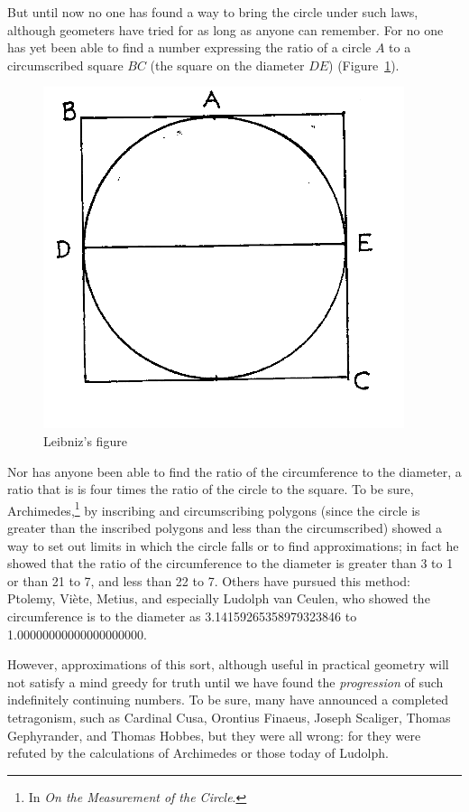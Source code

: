 \documentclass[polutonikogreek,english,twoside,openright]{article}
\begin{document}
But until now no one has found a way to bring the circle under such
laws, although geometers have tried for as long as anyone can
remember.  For no one has yet been able to find a number expressing
the ratio of a circle $A$ to a circumscribed square $BC$ (the square
on the diameter $DE$) (Figure~\ref{inscrcirc}).
\begin{figure}[htp]
  \begin{center}
    \includegraphics[width=.4\textwidth]{fig/Figure58}
    \caption{Leibniz's figure}
    \label{inscrcirc}
  \end{center}
\end{figure} Nor has anyone been able to find the ratio of the
circumference to the diameter, a ratio that is is four times the ratio
of the circle to the square.  To be sure, Archimedes,\footnote{In {\em
    On the Measurement of the Circle}.} by inscribing and
circumscribing polygons (since the circle is greater than the
inscribed polygons and less than the circumscribed) showed a way to
set out limits in which the circle falls or to find approximations; in
fact he showed that the ratio of the circumference to the diameter is
greater than 3 to 1 or than 21 to 7, and less than 22 to 7.  Others
have pursued this method: Ptolemy, Vi\`{e}te, Metius, and especially
Ludolph van Ceulen, who showed the circumference is to the diameter as
3.14159265358979323846 to 1.00000000000000000000.

However, approximations of this sort, although useful in practical
geometry will not satisfy a mind greedy for truth until we have found
the {\em progression} of such indefinitely continuing numbers.  To be
sure, many have announced a completed tetragonism, such as Cardinal
Cusa, Orontius Finaeus, Joseph Scaliger, Thomas Gephyrander, and
Thomas Hobbes, but they were all wrong: for they were refuted by the
calculations of Archimedes or those today of Ludolph.
\end{document}

